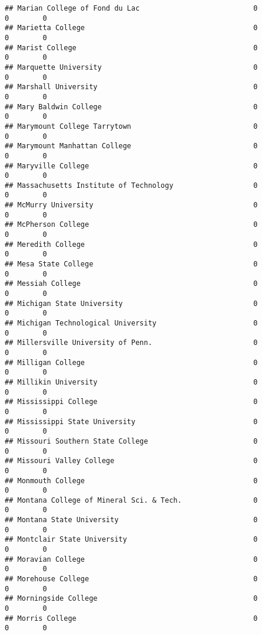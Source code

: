 \documentclass[
]{article}
\begin{document}
\begin{verbatim}
## Marian College of Fond du Lac                           0           0        0
## Marietta College                                        0           0        0
## Marist College                                          0           0        0
## Marquette University                                    0           0        0
## Marshall University                                     0           0        0
## Mary Baldwin College                                    0           0        0
## Marymount College Tarrytown                             0           0        0
## Marymount Manhattan College                             0           0        0
## Maryville College                                       0           0        0
## Massachusetts Institute of Technology                   0           0        0
## McMurry University                                      0           0        0
## McPherson College                                       0           0        0
## Meredith College                                        0           0        0
## Mesa State College                                      0           0        0
## Messiah College                                         0           0        0
## Michigan State University                               0           0        0
## Michigan Technological University                       0           0        0
## Millersville University of Penn.                        0           0        0
## Milligan College                                        0           0        0
## Millikin University                                     0           0        0
## Mississippi College                                     0           0        0
## Mississippi State University                            0           0        0
## Missouri Southern State College                         0           0        0
## Missouri Valley College                                 0           0        0
## Monmouth College                                        0           0        0
## Montana College of Mineral Sci. & Tech.                 0           0        0
## Montana State University                                0           0        0
## Montclair State University                              0           0        0
## Moravian College                                        0           0        0
## Morehouse College                                       0           0        0
## Morningside College                                     0           0        0
## Morris College                                          0           0        0

\end{verbatim}
\end{document}
